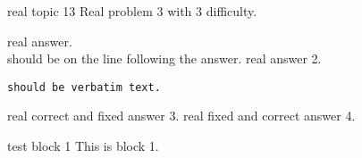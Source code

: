 \documentclass[master]{exam}
\begin{document}
	\begin{problem}[requires=test block 1]{real topic 1}{3}
		Real problem 3 with 3 difficulty.
		\begin{answers}
			\answer real answer. \\ should be on the line following the answer.
			\answer real answer 2.\begin{verbatim}should be verbatim text. \end{verbatim}
			 real correct and fixed answer 3.
			 real fixed and correct answer 4.
		\end{answers}
	\end{problem}

    \begin{block}{test block 1}
        This is block 1.
    \end{block}
\end{document}

